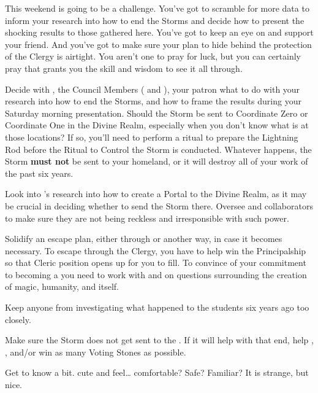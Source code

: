 \documentclass[char]{GL2020}
\begin{document}
This weekend is going to be a challenge. You've got to scramble for more data to inform your research into how to end the Storms and decide how to present the shocking results to those gathered here. You've got to keep an eye on \cChupInventor{} and support your friend. And you've got to make sure your plan to hide behind the protection of the Clergy is airtight. You aren't one to pray for luck, but you can certainly pray that \cTechGod{} grants you the skill and wisdom to see it all through.

\begin{itemz}
    \item Decide with \cAssistantScientist{}, the Council Members (\cAntiChup{} and \cTechStar{}), your patron \cDiplomat{} what to do with your research into how to end the Storms, and how to frame the results during your Saturday morning presentation. Should the Storm be sent to Coordinate Zero or Coordinate One in the Divine Realm, especially when you don’t know what is at those locations? If so, you'll need to perform a ritual to prepare the Lightning Rod before the Ritual to Control the Storm is conducted. Whatever happens, the Storm \textbf{must not} be sent to your homeland, or it will destroy all of your work of the past six years.
    \item Look into \cCurse{}’s research into how to create a Portal to the Divine Realm, as it may be crucial in deciding whether to send the Storm there. Oversee \cCurse{} and \cCurse{\their} collaborators to make sure they are not being reckless and irresponsible with such power.
    \item Solidify an escape plan, either through \cBeetle{} or another way, in case it becomes necessary. To escape through the Clergy, you have to help \cBeetle{} win the Principalship so that \cBeetle{\their} Cleric position opens up for you to fill. To convince \cBeetle{} of your commitment to becoming a \cHeadScientist{\cleric} you need to work with \cEbbPriest{} and \cScholarship{} on questions surrounding the creation of magic, humanity, and \pEarth{} itself.
    \item Keep anyone from investigating what happened to the students six years ago too closely.
    \item Make sure the Storm does not get sent to the \pTech{}. If it will help with that end, help \cTechStar{}, \cHeir{}, and/or \cScholarship{} win as many Voting Stones as possible.
    \item Get to know \cChupAvenger{} a bit. \cChupAvenger{\Theyare} cute and feel\cChupAvenger{\verbs}\ldots{} comfortable? Safe? Familiar? It is strange, but nice.
\end{itemz}
\end{document}
